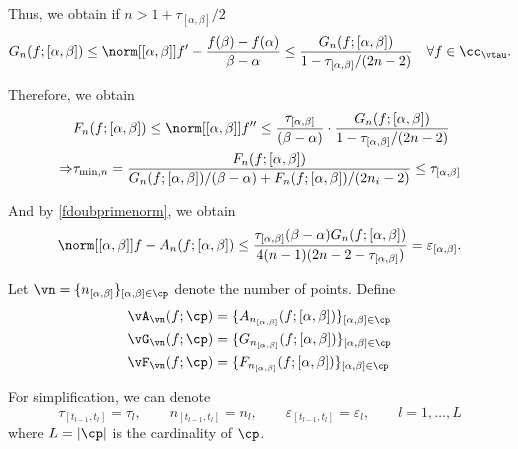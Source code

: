 \documentclass[]{elsarticle}
\theoremstyle{definition}
\theoremstyle{remark}
\begin{document}
Thus, we obtain if $ n>1+\tau_{[\alpha,\beta]}/2$
\begin{gather*}
G_n(f;[\alpha,\beta])\le \norm[{[\alpha, \beta]}]{f'-\frac{f(\beta)-f(\alpha)}{\beta-\alpha}} \le \frac{G_n(f;[\alpha,\beta])}{1-\tau_{[\alpha,\beta]}/(2n-2)} \quad \forall f \in \cc_{\vtau}.
\end{gather*}

Therefore, we obtain
\begin{align*}
& F_n(f;[\alpha,\beta]) \le \norm[{[\alpha,\beta]}]{f''} \le \frac{\tau_{[\alpha,\beta]}}{(\beta-\alpha)}\cdot\frac{G_n(f;[\alpha,\beta])}{1-\tau_{[\alpha,\beta]}/(2n-2)} \\
\Rightarrow
&\tau_{\min,n} =  \frac{F_{n}(f;[\alpha,\beta])}{G_{n}(f;[\alpha,\beta])/(\beta-\alpha)+F_{n}(f;[\alpha,\beta])/(2n_i-2)} \le \tau_{[\alpha,\beta]}\\
\end{align*}

And by \eqref{fdoubprimenorm}, we obtain
$$\norm[{[\alpha,\beta]}]{f-A_{n}(f;[\alpha,\beta])} \le  \frac{\tau_{[\alpha,\beta]}(\beta-\alpha) G_n(f;[\alpha,\beta]) } {4(n-1)(2n-2 -\tau_{[\alpha,\beta]})} =\varepsilon_{[\alpha,\beta]}.$$

Let $\vn=\{n_{[\alpha,\beta]}\}_{[\alpha,\beta] \in \cp}$ denote the number of points. Define
\begin{align*}
&\vA_{\vn}(f;\cp)=\{A_{n_{[\alpha,\beta]}}(f;[\alpha,\beta])\}_{[\alpha,\beta] \in \cp} \\
 &\vG_{\vn}(f;\cp)=\{G_{n_{[\alpha,\beta]}}(f;[\alpha,\beta])\}_{[\alpha,\beta] \in \cp} \\
&\vF_{\vn}(f;\cp)=\{F_{n_{[\alpha,\beta]}}(f;[\alpha,\beta])\}_{[\alpha,\beta] \in \cp} \\
\end{align*}

For simplification, we can denote
$$\tau_{[t_{l-1},t_l]}=\tau_l,\qquad n_{[t_{l-1},t_l]}=n_l, \qquad  \varepsilon_{[t_{l-1},t_l]}=\varepsilon_l, \qquad l=1,\ldots,L$$
where $L=|\cp|$ is the cardinality of $\cp$.
\end{document}
